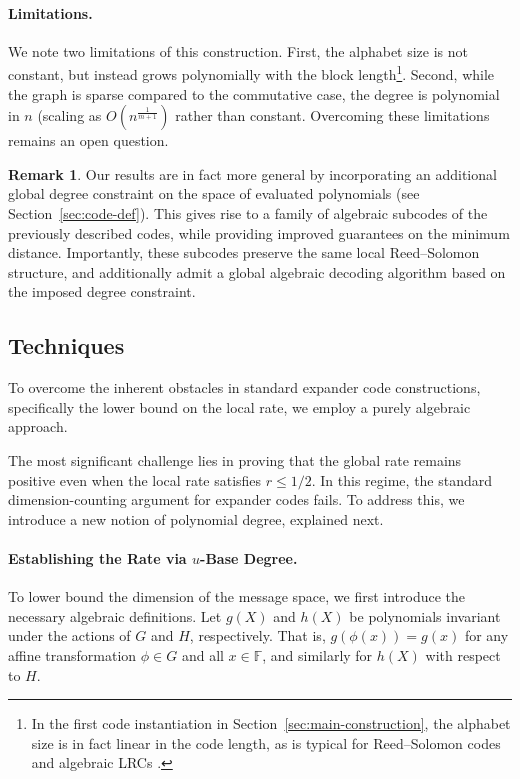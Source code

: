 \documentclass[11pt]{article}
\theoremstyle{plain}
\theoremstyle{definition}
\newtheorem{remark}[theorem]{Remark}
\begin{document}
\paragraph{Limitations.} We note two limitations of this construction. First, the alphabet size is not constant, but instead grows polynomially with the block length\footnote{In the first code instantiation in Section~\ref{sec:main-construction}, the alphabet size is in fact linear in the code length, as is typical for Reed--Solomon codes and algebraic LRCs \cite{tamo2014family}.}. Second, while the graph is sparse compared to the commutative case, the degree is polynomial in $n$ (scaling as $O\left(n^{\frac{1}{m+1}}\right)$ rather than constant. Overcoming these limitations remains an open question.

\begin{remark}
Our results are in fact more general by incorporating an additional global degree constraint on the space of evaluated polynomials (see Section~\ref{sec:code-def}). This gives rise to a family of algebraic subcodes of the previously described codes, while providing improved guarantees on the minimum distance. Importantly, these subcodes preserve the same local Reed--Solomon structure, and additionally admit a global algebraic decoding algorithm based on the imposed degree constraint.
\end{remark}
\subsection{Techniques}
To overcome the inherent obstacles in standard expander code constructions, specifically the lower bound on the local rate, we employ a purely algebraic approach.

The most significant challenge lies in proving that the global rate remains positive even when the local rate satisfies $r \le 1/2$. In this regime, the standard dimension-counting argument for expander codes fails. To address this, we introduce a new notion of polynomial degree, explained next.

\paragraph{Establishing the Rate via $u$-Base Degree.}
To lower bound the dimension of the message space, we first introduce the necessary algebraic definitions. Let $g(X)$ and $h(X)$ be polynomials invariant under the actions of $G$ and $H$, respectively. That is, $g(\phi(x)) = g(x)$ for any affine transformation $\phi \in G$ and all $x\in\mathbb{F}$, and similarly for $h(X)$ with respect to $H$.
\end{document}
